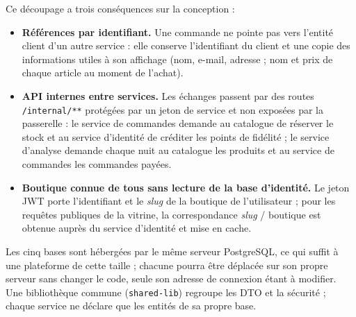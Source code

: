 Ce découpage a trois conséquences sur la conception :
\begin{itemize}
  \item \textbf{Références par identifiant.} Une commande ne pointe pas vers l'entité client d'un autre service : elle conserve l'identifiant du client et une copie des informations utiles à son affichage (nom, e-mail, adresse ; nom et prix de chaque article au moment de l'achat).
  \item \textbf{API internes entre services.} Les échanges passent par des routes \texttt{/internal/**} protégées par un jeton de service et non exposées par la passerelle : le service de commandes demande au catalogue de réserver le stock et au service d'identité de créditer les points de fidélité ; le service d'analyse demande chaque nuit au catalogue les produits et au service de commandes les commandes payées.
  \item \textbf{Boutique connue de tous sans lecture de la base d'identité.} Le jeton JWT porte l'identifiant et le \textit{slug} de la boutique de l'utilisateur ; pour les requêtes publiques de la vitrine, la correspondance \textit{slug} / boutique est obtenue auprès du service d'identité et mise en cache.
\end{itemize}

Les cinq bases sont hébergées par le même serveur PostgreSQL, ce qui suffit à une plateforme de cette taille ; chacune pourra être déplacée sur son propre serveur sans changer le code, seule son adresse de connexion étant à modifier. Une bibliothèque commune (\texttt{shared-lib}) regroupe les DTO et la sécurité ; chaque service ne déclare que les entités de sa propre base.

